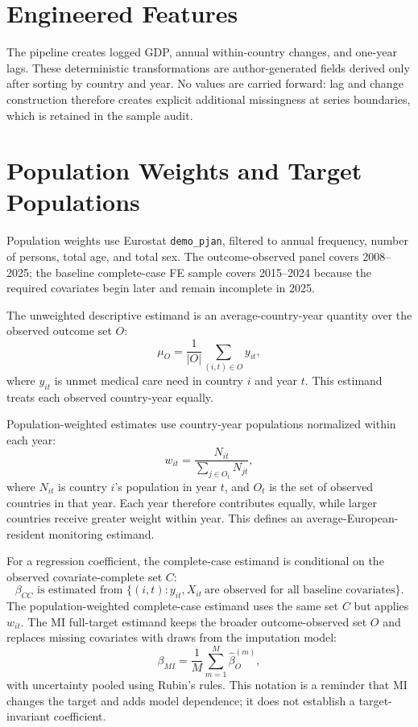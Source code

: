 \FloatBarrier

\section{Engineered Features}

The pipeline creates logged GDP, annual within-country changes, and one-year lags. These deterministic transformations are author-generated fields derived only after sorting by country and year. No values are carried forward: lag and change construction therefore creates explicit additional missingness at series boundaries, which is retained in the sample audit.

\section{Population Weights and Target Populations}

Population weights use Eurostat \texttt{demo\_pjan}, filtered to annual frequency, number of persons, total age, and total sex. The outcome-observed panel covers 2008--2025; the baseline complete-case FE sample covers 2015--2024 because the required covariates begin later and remain incomplete in 2025.

The unweighted descriptive estimand is an average-country-year quantity over the observed outcome set \(O\):
\[
\mu_{O} = \frac{1}{|O|}\sum_{(i,t)\in O} y_{it},
\]
where \(y_{it}\) is unmet medical care need in country \(i\) and year \(t\). This estimand treats each observed country-year equally.

Population-weighted estimates use country-year populations normalized within each year:
\[
w_{it} = \frac{N_{it}}{\sum_{j \in O_t} N_{jt}},
\]
where \(N_{it}\) is country \(i\)'s population in year \(t\), and \(O_t\) is the set of observed countries in that year. Each year therefore contributes equally, while larger countries receive greater weight within year. This defines an average-European-resident monitoring estimand.

For a regression coefficient, the complete-case estimand is conditional on the observed covariate-complete set \(C\):
\[
\beta_{CC} \text{ is estimated from } \{(i,t): y_{it},X_{it}\ \text{are observed for all baseline covariates}\}.
\]
The population-weighted complete-case estimand uses the same set \(C\) but applies \(w_{it}\). The MI full-target estimand keeps the broader outcome-observed set \(O\) and replaces missing covariates with draws from the imputation model:
\[
\beta_{MI} = \frac{1}{M}\sum_{m=1}^{M}\hat{\beta}^{(m)}_{O},
\]
with uncertainty pooled using Rubin's rules. This notation is a reminder that MI changes the target and adds model dependence; it does not establish a target-invariant coefficient.

